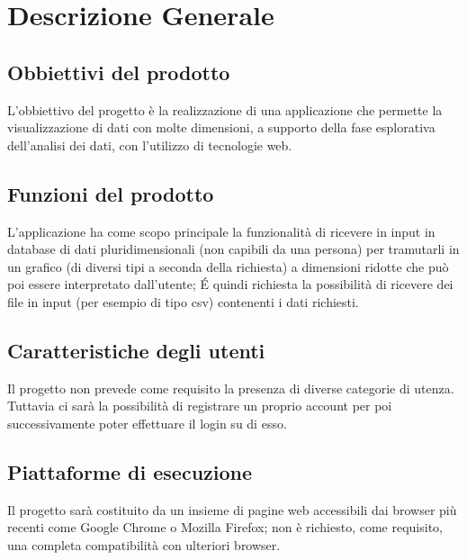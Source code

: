 \section{Descrizione Generale}
\subsection{Obbiettivi del prodotto}
L'obbiettivo del progetto è la realizzazione di una applicazione che permette la visualizzazione di dati con molte dimensioni, a supporto della fase esplorativa dell'analisi dei dati, con l'utilizzo di tecnologie web.
\subsection{Funzioni del prodotto}
L'applicazione ha come scopo principale la funzionalità di ricevere in input in database di dati pluridimensionali (non capibili da una persona) per tramutarli in un grafico (di diversi tipi a seconda della richiesta) a dimensioni ridotte che può poi essere interpretato dall'utente; \'E quindi richiesta la possibilità di ricevere dei file in input (per esempio di tipo csv) contenenti i dati richiesti.
\subsection{Caratteristiche degli utenti}
Il progetto non prevede come requisito la presenza di diverse categorie di utenza. Tuttavia ci sarà la possibilità di registrare un proprio account per poi successivamente poter effettuare il login su di esso.
\subsection{Piattaforme di esecuzione}
Il progetto sarà costituito da un insieme di pagine web accessibili dai browser più recenti come Google Chrome o Mozilla Firefox; non è richiesto, come requisito, una completa compatibilità con ulteriori browser.
